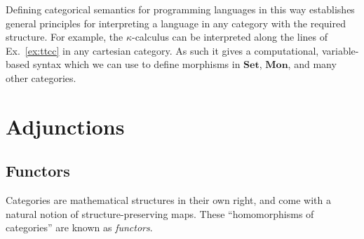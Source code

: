 \documentclass[11pt,oneside,draft]{book}
\newtheorem{example}[theorem]{Example}
\theoremstyle{definition}
\newcommand{\kw}[1]{\ensuremath{ \mathsf{#1} }}
\begin{document}

Defining categorical semantics for programming languages in this way
establishes general principles
for interpreting a language in any category
with the required structure.
For example,
the $\kappa$-calculus
\citep{kappa}
can be interpreted
along the lines of Ex.~\ref{ex:ttcc}
in any cartesian category.
As such it gives a computational,
variable-based syntax
which we can use to define morphisms
in $\mathbf{Set}$, $\mathbf{Mon}$,
and many other categories.



\section{Adjunctions} %

\subsection{Functors} %

Categories are mathematical structures in their own right,
and come with a natural notion of
structure-preserving maps.
These ``homomorphisms of categories'' are known as \emph{functors}.
\end{document}
